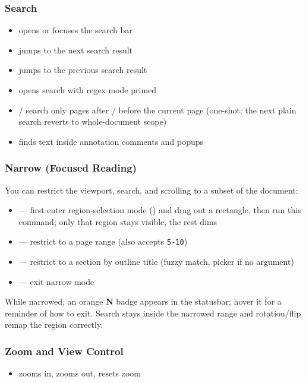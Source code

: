 \documentclass[a4paper,12pt]{article}
\begin{document}
\subsubsection{Search}
\begin{itemize}[leftmargin=*]
    \item \keys{/} opens or focuses the search bar
    \item {} jumps to the next search result
    \item {} jumps to the previous search result
    \item {} opens search with regex mode primed
    \item {} /  search only pages after / before the current page (one-shot; the next plain search reverts to whole-document scope)
    \item {} finds text inside annotation comments and popups
\end{itemize}

\subsubsection{Narrow (Focused Reading)}

You can restrict the viewport, search, and scrolling to a subset of the document:
\begin{itemize}[leftmargin=*]
    \item {} — first enter region-selection mode () and drag out a rectangle, then run this command; only that region stays visible, the rest dims
    \item {} — restrict to a page range (also accepts \texttt{5-10})
    \item {} — restrict to a section by outline title (fuzzy match, picker if no argument)
    \item {} — exit narrow mode
\end{itemize}

While narrowed, an orange \textbf{N} badge appears in the statusbar; hover it for a reminder of how to exit. Search stays inside the narrowed range and rotation/flip remap the region correctly.

\subsubsection{Zoom and View Control}
\begin{itemize}[leftmargin=*]
    \item \keys{=} zooms in, \quad \keys{-} zooms out, \quad {} resets zoom
\end{itemize}
\end{document}

